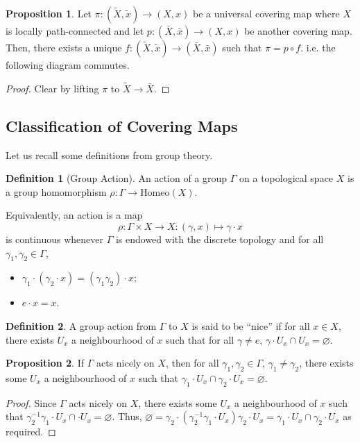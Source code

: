 \documentclass[]{article}
\theoremstyle{definition}
\theoremstyle{definition}
\newtheorem{definition}{Definition}[section]
\newtheorem{proposition}{Proposition}[section]
\begin{document}
\begin{proposition}
  Let \(\pi : (\tilde X, \tilde x) \to (X, x)\) be a universal covering map where \(X\) is locally 
  path-connected and let \(p : (\bar X, \bar x) \to (X, x)\) be another covering map.
  Then, there exists a unique \(f : (\tilde X, \tilde x) \to (\bar X, \bar x)\)
  such that \(\pi = p \circ f\). i.e. the following diagram commutes.
\end{proposition}
\begin{proof}
  Clear by lifting \(\pi\) to \(\tilde X \to \bar X\).
\end{proof}

\subsection{Classification of Covering Maps}

Let us recall some definitions from group theory.

\begin{definition}[Group Action]
  An action of a group \(\Gamma\) on a topological space \(X\) is a group homomorphism 
  \(\rho : \Gamma \to \text{Homeo}(X)\).
\end{definition}

Equivalently, an action is a map 
\[\rho : \Gamma \times X \to X : (\gamma, x) \mapsto \gamma \cdot x\]
is continuous whenever \(\Gamma\) is endowed with the discrete topology and 
for all \(\gamma_1, \gamma_2 \in \Gamma\),
\begin{itemize}
  \item \(\gamma_1 \cdot (\gamma_2 \cdot x) = (\gamma_1 \gamma_2) \cdot x\);
  \item \(e \cdot x = x\).
\end{itemize}

\begin{definition}
  A group action from \(\Gamma\) to \(X\) is said to be ``nice'' if for all 
  \(x \in X\), there exists \(U_x\) a neighbourhood of \(x\) such that for all 
  \(\gamma \neq e\), \(\gamma \cdot U_x \cap U_x = \varnothing\).
\end{definition}

\begin{proposition}
  If \(\Gamma\) acts nicely on \(X\), then for all \(\gamma_1, \gamma_2 \in \Gamma\), 
  \(\gamma_1 \neq \gamma_2\), there exists some \(U_x\) a neighbourhood of \(x\) 
  such that \(\gamma_1 \cdot U_x \cap \gamma_2 \cdot U_x = \varnothing\).
\end{proposition}
\begin{proof}
  Since \(\Gamma\) acts nicely on \(X\), there exists some \(U_x\) a neighbourhood 
  of \(x\) such that \(\gamma_2^{-1} \gamma_1 \cdot U_x \cap \cdot U_x = \varnothing\).
  Thus, \(\varnothing = \gamma_2 \cdot (\gamma_2^{-1} \gamma_1 \cdot U_x )\gamma_2 \cdot U_x
  = \gamma_1 \cdot U_x \cap \gamma_2 \cdot U_x\) as required.
\end{proof}
\end{document}
